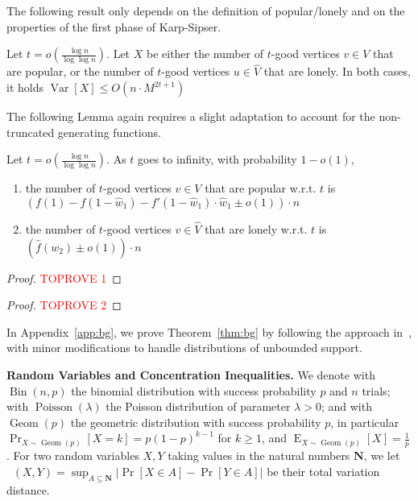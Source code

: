 \documentclass[11pt]{article}
\DeclareMathOperator{\geom}{Geom}
\DeclareMathOperator*{\E}{E}
\DeclareMathOperator*{\Var}{Var}
\DeclareMathOperator*{\Bin}{Bin}
\DeclareMathOperator*{\Poisson}{Poisson}
\DeclareMathOperator*{\dTV}{\textit{d}_{TV}}
\newcommand{\maxdeg}{M}
\begin{document}
\begin{toappendix}
The following result only depends on the definition of popular/lonely and on the properties of the first phase of Karp-Sipser.
\begin{lemma}\label{lem:bg-concentration-3-7}
Let $t=o\left(\frac{\log n}{\log \log n}\right)$. Let $X$ be either the number of $t$-good vertices $v\in V$ that are popular, or the number of $t$-good vertices $u\in \hat{V}$ that are lonely. In both cases, it holds $\Var[X] \leq O(n\cdot \maxdeg^{2t+1})$
\end{lemma}

The following Lemma again requires a slight adaptation to account for the non-truncated generating functions. 

\begin{lemma}\label{lem:bg-3-7}
Let $t=o\left(\frac{\log n}{\log\log n}\right)$. As $t$ goes to infinity, with probability $1-o(1)$, 
\begin{enumerate}
\item the number of $t$-good vertices $v\in V$ that are popular w.r.t. $t$ is $(f(1) - f(1-\hat{w}_1) - f'(1-\hat{w}_1)\cdot \hat{w}_1 \pm o(1))\cdot n$ 
\item the number of $t$-good vertices $v\in \hat{V}$ that are lonely w.r.t. $t$ is $(\hat{f}(w_2) \pm o(1))\cdot n$
\end{enumerate}
\end{lemma}
\begin{proof}\textcolor{red}{TOPROVE 1}\end{proof}
\begin{proof}\textcolor{red}{TOPROVE 2}\end{proof}
\end{toappendix}
In Appendix~\ref{app:bg}, we prove Theorem~\ref{thm:bg} by following the approach in~\cite{bg15}, with  minor modifications  to handle distributions of unbounded support.

\smallskip

{\bf Random Variables and Concentration Inequalities.} We denote with $\Bin(n,p)$ the binomial distribution with success probability $p$ and $n$ trials; with $\Poisson(\lambda)$ the Poisson distribution of parameter $\lambda>0$; and with $\geom(p)$ the geometric distribution with success probability $p$, in particular $\Pr_{X\sim \geom(p)}[X=k]=p(1-p)^{k-1}$ for $k\ge 1$, and $\E_{X\sim\geom(p)}[X]=\frac{1}{p}$. For two random variables $X,Y$ taking values in the natural numbers $\mathbf{N}$, we let $\dTV(X,Y)=\sup_{A\subseteq \mathbf{N}}\left|\Pr[X\in A] - \Pr[Y \in A]\right|$ be their total variation distance. 
\end{document}
